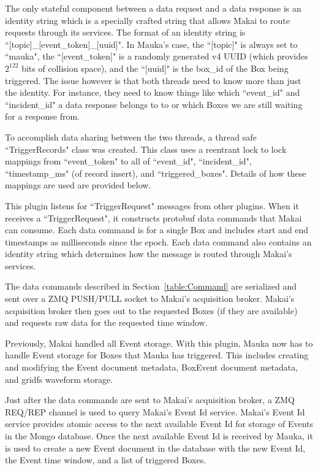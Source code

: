 The only stateful component between a data request and a data response is an identity string which is a specially crafted string that allows Makai to route requests through its services. The format of an identity string is ``[topic]\_[event\_token]\_[uuid]". In Mauka's case, the ``[topic]" is always set to ``mauka", the ``[event\_token]" is a randomly generated v4 UUID (which provides $2^{122}$ bits of collision space), and the ``[uuid]" is the box\_id of the Box being triggered. The issue however is that both threads need to know more than just the identity. For instance, they need to know things like which ``event\_id" and ``incident\_id" a data response belongs to to or which Boxes we are still waiting for a response from.

To accomplish data sharing between the two threads, a thread safe ``TriggerRecords" class was created. This class uses a reentrant lock to lock mappings from ``event\_token" to all of ``event\_id", ``incident\_id", ``timestamp\_ms" (of record insert), and ``triggered\_boxes".  Details of how these mappings are used are provided below.

This plugin listens for ``TriggerRequest" messages from other plugins. When it receives a ``TriggerRequest", it constructs protobuf data commands that Makai can consume. Each data command is for a single Box and includes start and end timestamps as milliseconds since the epoch. Each data command also contains an identity string which determines how the message is routed through Makai's services.

The data commands described in Section~\ref{table:Command} are serialized and sent over a ZMQ PUSH/PULL socket to Makai's acquisition broker. Makai's acquisition broker then goes out to the requested Boxes (if they are available) and requests raw data for the requested time window.

Previously, Makai handled all Event storage. With this plugin, Mauka now has to handle Event storage for Boxes that Mauka has triggered. This includes creating and modifying the Event document metadata, BoxEvent document metadata, and gridfs waveform storage.

Just after the data commands are sent to Makai's acquisition broker, a ZMQ REQ/REP channel is used to query Makai's Event Id service. Makai's Event Id service provides atomic access to the next available Event Id for storage of Events in the Mongo database. Once the next available Event Id is received by Mauka, it is used to create a new Event document in the database with the new Event Id, the Event time window, and a list of triggered Boxes.

